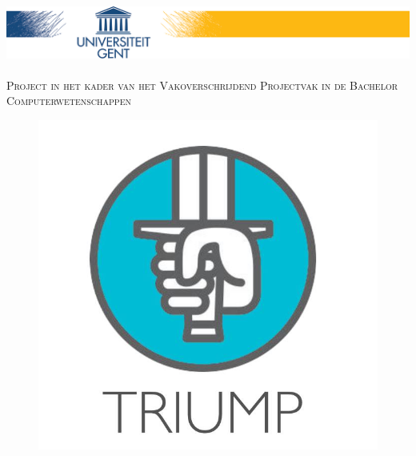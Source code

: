 \documentclass[a4paper,11.5pt]{report}
\begin{document}



\begin{titlepage}
\begin{center}

\includegraphics[width=\linewidth]{ugent}~\\[2.5cm]

\textsc{Project in het kader van het Vakoverschrijdend Projectvak in de Bachelor Computerwetenschappen}\\[1.5cm]




\begin{figure}[H]
	\centering
	\includegraphics[scale=0.25]{triump}
	\label{fig:titelblad}
	

\end{figure}
\end{center}
\end{titlepage}
\end{document}
